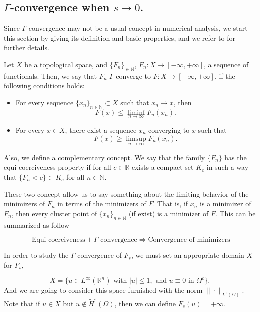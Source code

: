 \documentclass{amsart}
\newcommand{\rn}{{\mathbb{R}^n}}
\newcommand{\W}{\Omega}
\def\N{{\mathbb {N}}}
\theoremstyle{remark}
\theoremstyle{definition}
\numberwithin{equation}{section}
\begin{document}
\subsection{$\Gamma$-convergence when $s \rightarrow 0$.}

Since $\Gamma$-convergence may not be a usual concept in numerical analysis, we start this section by giving its definition and basic properties, and we refer to \cite{gamma} for further details. 

Let $X$ be a topological space, and $\{F_n\}_{\in \N}$, $F_n : X \to [-\infty,+\infty]$, a sequence of functionals. Then, we say that $F_n$ $\Gamma$-converge to $F: X \to [-\infty,+\infty]$, if the following conditions holds: 

\begin{itemize}
\item For every sequence $\{x_n\}_{n \in \N} \subset X$ such that $x_n \to x$, then 
$$F(x) \leq \liminf_{n \to \infty} F_n (x_n).$$  

\item For every $x \in X$, there exist a sequence $x_n$ converging to $x$ such that
$$F(x) \geq \limsup_{n \to \infty} F_n (x_n).$$
\end{itemize} 

Also, we define a complementary concept. We say that the family  $\{F_n\}$ has the equi-coerciveness property if for all $c \in \mathbb{R}$ exists a compact set $K_c$ in such a way that $\{F_n < c \}\subset K_c$ for all $n \in \N$.

These two concept allow us to say something about the limiting behavior of the minimizers of $F_n$ in terms of the minimizers of $F$. That is, if $x_n$ is a minimizer of $F_n$, then every cluster point of $\{x_n\}_{n \in \N}$ (if exist) is a minimizer of $F$. This can be summarized as follow 

$$\text{ Equi-coerciveness} + \Gamma\text{-convergence} \Rightarrow \text{Convergence of minimizers}$$      




In order to study the $\Gamma$-convergence of $F_s$, we must set an appropriate domain $X$ for $F_s$, 

$$X=\{u \in L^{\infty}(\rn) \text{ with } |u|\leq 1, \text{ and } u \equiv 0 \text{ in } \Omega^c \}.$$ 
And we are going to consider this space furnished with the norm $\| \cdot \|_{L^1(\W)}$. Note that if $u \in X$ but $u \not \in \tilde{H}^s(\Omega)$, then we can define $F_s(u) = +\infty$. 
\end{document}
